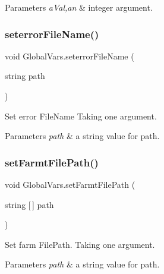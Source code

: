 \begin{DoxyParams}{Parameters}
{\em a\+Val,an} & integer argument. \\
\hline
\end{DoxyParams}
\mbox{\label{class_global_vars_ace9170eba61644f40c5689d021e7ac8b}} 
\subsubsection{\texorpdfstring{seterrorFileName()}{seterrorFileName()}}
{\footnotesize\ttfamily void Global\+Vars.\+seterror\+File\+Name (\begin{DoxyParamCaption}\item[{string}]{path }\end{DoxyParamCaption})\hspace{0.3cm}{\ttfamily [inline]}}



Set error File\+Name Taking one argument. 


\begin{DoxyParams}{Parameters}
{\em path} & a string value for path. \\
\hline
\end{DoxyParams}
\mbox{\label{class_global_vars_a6467ce1bbcd14765a635d91f4e6618d5}} 
\subsubsection{\texorpdfstring{setFarmtFilePath()}{setFarmtFilePath()}}
{\footnotesize\ttfamily void Global\+Vars.\+set\+Farmt\+File\+Path (\begin{DoxyParamCaption}\item[{string \mbox{[}$\,$\mbox{]}}]{path }\end{DoxyParamCaption})\hspace{0.3cm}{\ttfamily [inline]}}



Set farm File\+Path. Taking one argument. 


\begin{DoxyParams}{Parameters}
{\em path} & a string value for path. \\
\hline
\end{DoxyParams}
\mbox{\label{class_global_vars_a6ca2fb796401a8ef3d42042c2e60a773}} 
